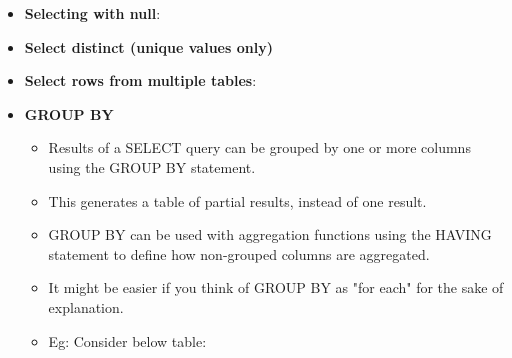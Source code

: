 \begin{flushleft}
\begin{itemize}
			
			\item \textbf{Selecting with null}: 
			\bigskip
			\bigskip
			\item \textbf{Select distinct (unique values only)}
			\bigskip
			\item \textbf{Select rows from multiple tables}:
			\bigskip
			\bigskip
			\item \textbf{GROUP BY}
			\begin{itemize}
				\item Results of a SELECT query can be grouped by one or more columns using the GROUP BY statement. 
				\item This generates a table of partial results, instead of one result. 
				\item GROUP BY can be used with aggregation functions using the HAVING statement to deﬁne how non-grouped columns are aggregated.
				\item It might be easier if you think of GROUP BY as "for each" for the sake of explanation.

				\item Eg: Consider below table:
				\bigskip
			\end{itemize}
			

\end{itemize}
\end{flushleft}
